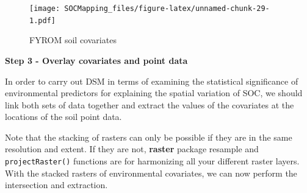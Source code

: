 \documentclass[10pt,b5paper,]{book}
\newenvironment{Shaded}{\begin{snugshade}}{\end{snugshade}}
\newcommand{\CommentTok}[1]{\textcolor[rgb]{0.56,0.35,0.01}{\textit{#1}}}
\newcommand{\DataTypeTok}[1]{\textcolor[rgb]{0.13,0.29,0.53}{#1}}
\newcommand{\ErrorTok}[1]{\textcolor[rgb]{0.64,0.00,0.00}{\textbf{#1}}}
\newcommand{\KeywordTok}[1]{\textcolor[rgb]{0.13,0.29,0.53}{\textbf{#1}}}
\newcommand{\NormalTok}[1]{#1}
\newcommand{\OperatorTok}[1]{\textcolor[rgb]{0.81,0.36,0.00}{\textbf{#1}}}
\newcommand{\OtherTok}[1]{\textcolor[rgb]{0.56,0.35,0.01}{#1}}
\newcommand{\StringTok}[1]{\textcolor[rgb]{0.31,0.60,0.02}{#1}}
\theoremstyle{definition}
\theoremstyle{definition}
\theoremstyle{definition}
\theoremstyle{remark}
\begin{document}
\begin{figure}
\centering
\texttt{[image: SOCMapping\_files/figure-latex/unnamed-chunk-29-1.pdf]}
\caption{\label{fig:unnamed-chunk-29}FYROM soil covariates}
\end{figure}

\textbf{Step 3 - Overlay covariates and point data}

In order to carry out DSM in terms of examining the statistical
significance of environmental predictors for explaining the spatial
variation of SOC, we should link both sets of data together and extract
the values of the covariates at the locations of the soil point data.

Note that the stacking of rasters can only be possible if they are in
the same resolution and extent. If they are not, \textbf{raster} package
resample and \texttt{projectRaster()} functions are for harmonizing all
your different raster layers. With the stacked rasters of environmental
covariates, we can now perform the intersection and extraction.

\begin{Shaded}
\end{Shaded}
\end{document}

